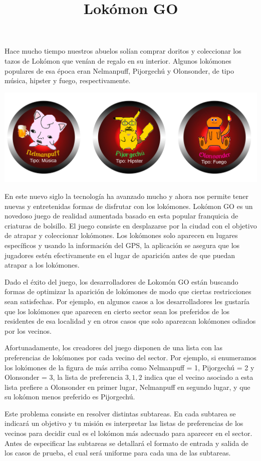 \documentclass{oci}
\title{Lokómon GO}
\begin{document}
\begin{problemDescription}
Hace mucho tiempo nuestros abuelos solían comprar doritos y coleccionar los
tazos de Lokómon que venían de regalo en su interior.
Algunos lokómones populares de esa época eran Nelmanpuff, Pijorgechú
y Olonsonder, de tipo música, hipster y fuego, respectivamente.

\begin{center}
	\includegraphics[scale=0.4]{lokomons.jpg}
\end{center}

En este nuevo siglo la tecnología ha avanzado mucho y ahora nos permite tener
nuevas y entretenidas formas de disfrutar con los lokómones.
Lokómon GO es un novedoso juego de realidad aumentada basado en esta popular
franquicia de criaturas de bolsillo.
El juego consiste en desplazarse por la ciudad con el objetivo de atrapar y
coleccionar lokómones.
Los lokómones solo aparecen en lugares específicos y usando la
información del GPS, la aplicación se asegura que los jugadores estén
efectivamente en el lugar de aparición antes de que puedan atrapar a los
lokómones.

Dado el éxito del juego, los desarrolladores de Lokomón GO están buscando formas
de optimizar la aparición de lokómones de modo que ciertas restricciones sean
satisfechas.
Por ejemplo, en algunos casos a los desarrolladores les gustaría que los
lokómones que aparecen en cierto sector sean los preferidos de los residentes de
esa localidad y en otros casos que solo aparezcan lokómones odiados por los
vecinos.

Afortunadamente, los creadores del juego disponen de una lista con las
preferencias de lokómones por cada vecino del sector.
Por ejemplo, si enumeramos los lokómones de la figura de más arriba como
Nelmanpuff = 1, Pijorgechú = 2 y Olonsonder = 3, la lista de preferencia $3, 1,
2$ indica que el vecino asociado a esta lista prefiere a Olonsonder en primer
lugar, Nelmanpuff en segundo lugar, y que su lokómon menos preferido es
Pijorgechú.

Este problema consiste en resolver distintas subtareas.
En cada subtarea se indicará un objetivo y tu misión es interpretar las
listas de preferencias de los vecinos para decidir cual es el lokómon más
adecuado para aparecer en el sector.
Antes de especificar las subtareas se detallará el formato de entrada y salida
de los casos de prueba, el cual será uniforme para cada una de las subtareas.
\end{problemDescription}
\end{document}
